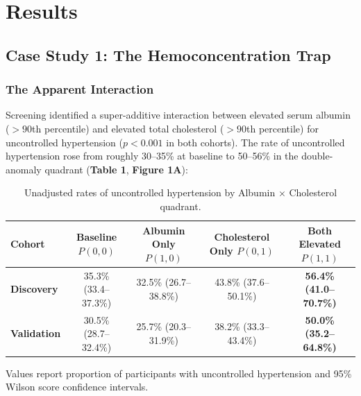 \documentclass[10pt,letterpaper]{article}
\begin{document}
\section{Results}

\subsection{Case Study 1: The Hemoconcentration Trap}

\subsubsection{The Apparent Interaction}
Screening identified a super-additive interaction between elevated serum albumin ($>90$th percentile) and elevated total cholesterol ($>90$th percentile) for uncontrolled hypertension ($p < 0.001$ in both cohorts). The rate of uncontrolled hypertension rose from roughly 30--35\% at baseline to 50--56\% in the double-anomaly quadrant (\textbf{Table 1}, \textbf{Figure 1A}):

\begin{table}[htbp]
\centering
\small
\begin{threeparttable}
\caption{Unadjusted rates of uncontrolled hypertension by Albumin $\times$ Cholesterol quadrant.}
\begin{tabular*}{\linewidth}{@{\extracolsep{\fill}}lcccc@{}}
\toprule
\textbf{Cohort} & \textbf{Baseline} $P(0,0)$ & \textbf{Albumin Only} $P(1,0)$ & \textbf{Cholesterol Only} $P(0,1)$ & \textbf{Both Elevated} $P(1,1)$ \\
\midrule
\textbf{Discovery} & 35.3\% (33.4--37.3\%) & 32.5\% (26.7--38.8\%) & 43.8\% (37.6--50.1\%) & \textbf{56.4\% (41.0--70.7\%)} \\
\textbf{Validation} & 30.5\% (28.7--32.4\%) & 25.7\% (20.3--31.9\%) & 38.2\% (33.3--43.4\%) & \textbf{50.0\% (35.2--64.8\%)} \\
\bottomrule
\end{tabular*}
\begin{tablenotes}
\footnotesize
\item Values report proportion of participants with uncontrolled hypertension and 95\% Wilson score confidence intervals.
\end{tablenotes}
\end{threeparttable}
\end{table}
\end{document}
